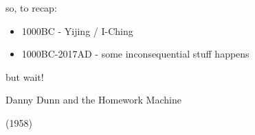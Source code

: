 \documentclass{beamer}
\begin{document}


\begin{frame}{so, to recap:}
	\begin{itemize}
		\item 1000BC - Yijing / I-Ching
		\pause
		\item 1000BC-2017AD - some inconsequential stuff happens
	\end{itemize}
\end{frame}

\begin{frame}[c]
	but wait!
	
	\centering
	\Huge
	Danny Dunn and the Homework Machine
	
	(1958)
\end{frame}

\begin{frame}[plain]
\end{frame}

\end{document}
